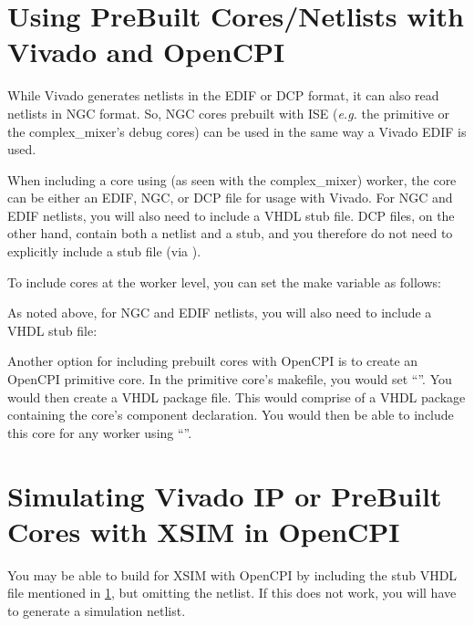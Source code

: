 \begin{flushleft}
\section{Using PreBuilt Cores/Netlists with Vivado and OpenCPI}
\label{prebuiltcore}
While Vivado generates netlists in the EDIF or DCP format, it can also read netlists in NGC format. So, NGC cores prebuilt with ISE (\textit{e.g.} the  primitive or the complex\_mixer's debug cores) can be used in the same way a Vivado EDIF is used. \newline

When including a core using  (as seen with the complex\_mixer) worker, the core can be either an EDIF, NGC, or DCP file for usage with Vivado. For NGC and EDIF netlists, you will also need to include a VHDL stub file.
DCP files, on the other hand, contain both a netlist and a stub, and you therefore do not need to explicitly include a stub file (via ).\newline

To include cores at the worker level, you can set the  make variable as follows:\newline
{}\newline

As noted above, for NGC and EDIF netlists, you will also need to include a VHDL stub file:\newline
{}\newline

Another option for including prebuilt cores with OpenCPI is to create an OpenCPI primitive core. In the primitive core's makefile, you would set ``''. You would then create a VHDL package file. This would comprise of a VHDL package containing the core's component declaration. You would then be able to include this core for any worker using ``''.

\section{Simulating Vivado IP or PreBuilt Cores with XSIM in OpenCPI}
\label{sim_ip}
You may be able to build for XSIM with OpenCPI by including the stub VHDL file mentioned in \ref{prebuiltcore}, but omitting the netlist. If this does not work, you will have to generate a simulation netlist. \newline


\end{flushleft}
